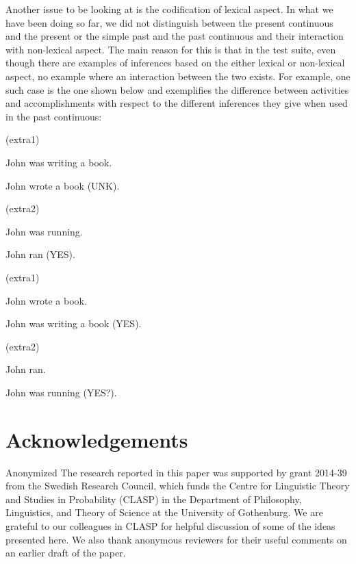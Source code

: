 \documentclass[a4paper,11pt]{article}
\newcommand\hyp{\item[H]}
\newcommand\fracasex[2]{\begin{lingex}\item[(#1)] \begin{subex} #2 \end{subex} \end{lingex} }
\begin{document}
Another issue to be looking at is the codification of lexical
aspect. In what we have been doing so far, we did not distinguish
between the present continuous and the present or the simple past and
the past continuous and their interaction with non-lexical aspect.
The main reason for this is that in the test suite, even though there
are examples of inferences based on the either lexical or non-lexical
aspect, no example where an interaction between the two exists. For
example, one such case is the one shown below and exemplifies the
difference between activities and accomplishments with respect to the
different inferences they give when used in the past continuous:

\fracasex{extra1}{
	\item	John was writing a book. 
	\hyp 	John wrote a book (UNK).
}

\fracasex{extra2}{
	\item	John was running. 
	\hyp 	John ran (YES).
}

\fracasex{extra1}{
	\item	John wrote a book. 
	\hyp 	John was writing a book (YES).
}

\fracasex{extra2}{
	\item	John ran.
	\hyp 	John was running (YES?).
}



\section*{Acknowledgements}

\ifanon
Anonymized
\else
The research reported in this paper was supported by grant 2014-39 from the
Swedish Research Council, which funds the Centre for Linguistic Theory and
Studies in Probability (CLASP) in the Department of Philosophy, Linguistics,
and Theory of Science at the University of Gothenburg. We are grateful to
our colleagues in CLASP for helpful discussion of some of the ideas presented
here. We also thank anonymous reviewers for their useful comments on an
earlier draft of the paper.
\fi





\end{document}
